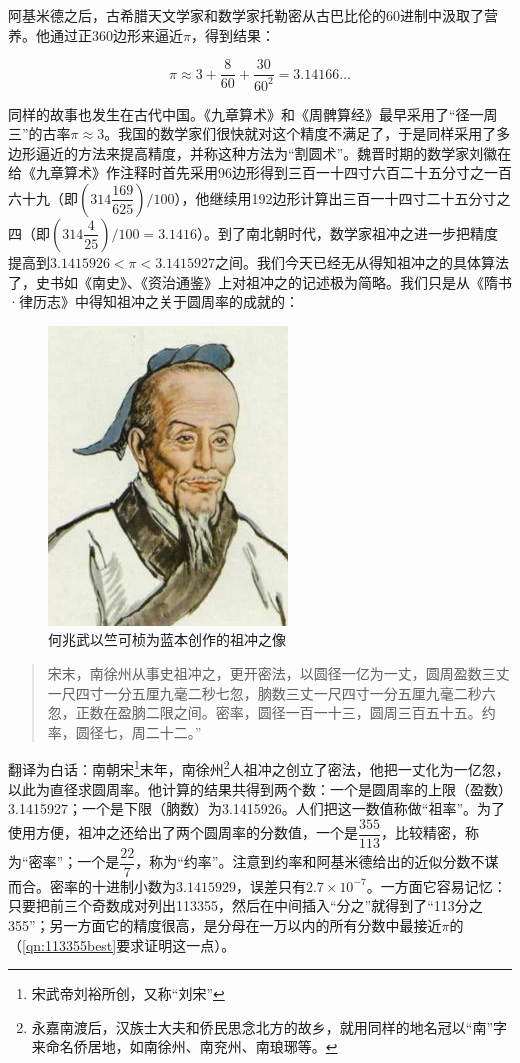 \documentclass[b5paper]{ctexart}
\begin{document}
阿基米德之后，古希腊天文学家和数学家托勒密从古巴比伦的60进制中汲取了营养。他通过正360边形来逼近$\pi$，得到结果：

\[
\pi \approx 3 + \frac{8}{60} + \frac{30}{60^2} = 3.14166\dotso
\]

同样的故事也发生在古代中国。《九章算术》和《周髀算经》最早采用了“径一周三”的古率$\pi \approx 3$。我国的数学家们很快就对这个精度不满足了，于是同样采用了多边形逼近的方法来提高精度，并称这种方法为“割圆术”。魏晋时期的数学家刘徽在给《九章算术》作注释时首先采用96边形得到三百一十四寸六百二十五分寸之一百六十九（即$(314\dfrac{169}{625})/100$），他继续用192边形计算出三百一十四寸二十五分寸之四（即$(314\dfrac{4}{25})/100 = 3.1416$）。到了南北朝时代，数学家祖冲之进一步把精度提高到$3.1415926 < \pi < 3.1415927$之间。我们今天已经无从得知祖冲之的具体算法了，史书如《南史》、《资治通鉴》上对祖冲之的记述极为简略。我们只是从《隋书·律历志》中得知祖冲之关于圆周率的成就的：

\begin{figure}[htbp]
 \centering
 \includegraphics[scale=0.5]{img/zuchongzhi}
 \caption{何兆武以竺可桢为蓝本创作的祖冲之像}
 \label{fig:zuchongzhi}
\end{figure}

\begin{quotation}
宋末，南徐州从事史祖冲之，更开密法，以圆径一亿为一丈，圆周盈数三丈一尺四寸一分五厘九毫二秒七忽，朒数三丈一尺四寸一分五厘九毫二秒六忽，正数在盈朒二限之间。密率，圆径一百一十三，圆周三百五十五。约率，圆径七，周二十二。”
\end{quotation}

翻译为白话：南朝宋\footnote{宋武帝刘裕所创，又称“刘宋”}末年，南徐州\footnote{永嘉南渡后，汉族士大夫和侨民思念北方的故乡，就用同样的地名冠以“南”字来命名侨居地，如南徐州、南兖州、南琅琊等。}人祖冲之创立了密法，他把一丈化为一亿忽，以此为直径求圆周率。他计算的结果共得到两个数：一个是圆周率的上限（盈数）3.1415927；一个是下限（朒数）为3.1415926。人们把这一数值称做“祖率”。为了使用方便，祖冲之还给出了两个圆周率的分数值，一个是$\dfrac{355}{113}$，比较精密，称为“密率”；一个是$\dfrac{22}{7}$，称为“约率”。注意到约率和阿基米德给出的近似分数不谋而合。密率的十进制小数为$3.1415929$，误差只有$2.7 \times 10^{-7}$。一方面它容易记忆：只要把前三个奇数成对列出113355，然后在中间插入“分之”就得到了“113分之355”；另一方面它的精度很高，是分母在一万以内的所有分数中最接近$\pi$的（\cref{qn:113355best}要求证明这一点）。
\end{document}
